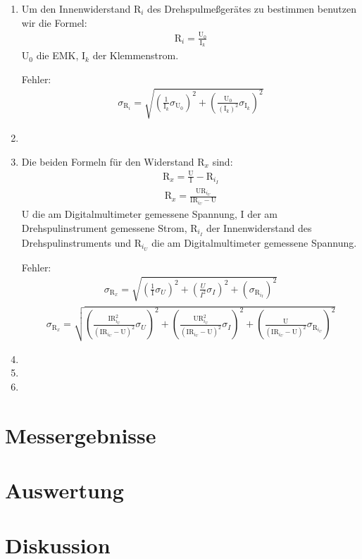 \documentclass[12pt]{scrartcl}
\begin{document}
\begin{enumerate}

	\item
	Um den Innenwiderstand R$_i$ des 				Drehspulmeßgerätes zu bestimmen benutzen 	wir die Formel:
	\begin{align}
	\text{R}_{i}= \frac{\text{U}_0}					{\text{I}_k}
	\end{align}
	U$_0$ die EMK, I$_k$ der Klemmenstrom.
	
	Fehler:
	\begin{align}
	\sigma_{\text{R}_i} = 							\sqrt{\left(\frac{1}{\text{I}_k}\sigma_{\text{U}_0}\right)^2
	+\left(\frac{\text{U}_0}{(\text{I}_k)^2}\sigma_{\text{I}_k}\right)^2}
	\end{align}	 
	\item
	\item
	Die beiden Formeln für den Widerstand 			R$_x$ sind:
	\begin{align}
	\text{R}_x=\frac{\text{U}}						{\text{I}}-\text{R}_{i_I}
	\end{align}
	\begin{align}
	\text{R}_x= 										\frac{\text{U}\text{R}_{i_U}}					{\text{I}\text{R}_{i_U}-\text{U}}
	\end{align}
	U die am Digitalmultimeter gemessene 			Spannung, I der am Drehspulinstrument 			gemessene Strom, R$_{i_I}$ der 					Innenwiderstand des Drehspulinstruments 			und R$_{i_U}$ die am Digitalmultimeter 			gemessene Spannung.
	
	Fehler:
	\begin{align}
	\sigma_{\text{R}_x}=
	\sqrt{\left(\frac{1}								{\text{I}}\sigma_U\right)^2+
	\left(\frac{U}{I^2}\sigma_I\right)^2+
	\left(\sigma_{\text{R}_{i_I}}\right)^2}
	\end{align}		
	\begin{align}
	\sigma_{\text{R}_x}=
	\sqrt{\left(\frac{\text{I}
	\text{R}_{i_U}^2}								{(\text{I}\text{R}_{i_U}-
	\text{U})^2}\sigma_U\right)^2+
	\left(\frac{\text{U}\text{R}_{i_U}^2}			{(\text{I}\text{R}_{i_U}-
	\text{U})^2}\sigma_I\right)^2+
	\left(\frac{\text{U}}							{(\text{I}\text{R}_{i_U}-
	\text{U})^2}\sigma_{
	\text{R}_{i_U}}\right)^2}
	\end{align}	 
	\item
	\item
	\item
	
\end{enumerate}


\section{Messergebnisse}



\section{Auswertung}


\section{Diskussion}


\end{document}
